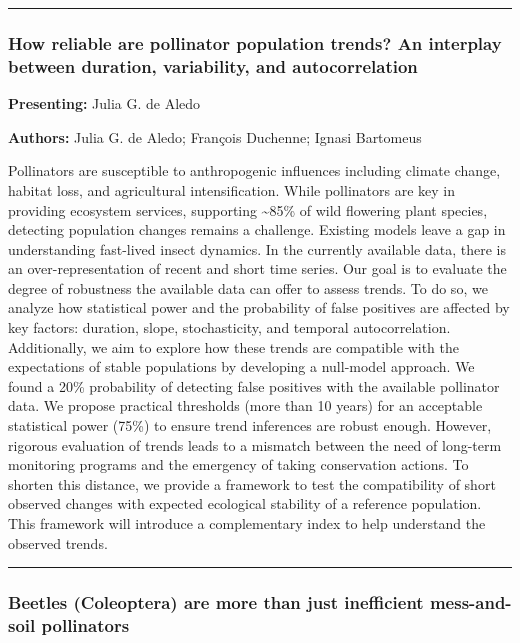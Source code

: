 \documentclass[
  letterpaper,
  DIV=11,
  numbers=noendperiod]{scrartcl}
\begin{document}
\begin{center}\rule{0.5\linewidth}{0.5pt}\end{center}

\subsubsection{How reliable are pollinator population trends? An
interplay between duration, variability, and
autocorrelation}\label{how-reliable-are-pollinator-population-trends-an-interplay-between-duration-variability-and-autocorrelation}

\textbf{Presenting:} Julia G. de Aledo

\textbf{Authors:} Julia G. de Aledo; François Duchenne; Ignasi Bartomeus

Pollinators are susceptible to anthropogenic influences including
climate change, habitat loss, and agricultural intensification. While
pollinators are key in providing ecosystem services, supporting
\textasciitilde85\% of wild flowering plant species, detecting
population changes remains a challenge. Existing models leave a gap in
understanding fast-lived insect dynamics. In the currently available
data, there is an over-representation of recent and short time series.
Our goal is to evaluate the degree of robustness the available data can
offer to assess trends. To do so, we analyze how statistical power and
the probability of false positives are affected by key factors:
duration, slope, stochasticity, and temporal autocorrelation.
Additionally, we aim to explore how these trends are compatible with the
expectations of stable populations by developing a null-model approach.
We found a 20\% probability of detecting false positives with the
available pollinator data. We propose practical thresholds (more than 10
years) for an acceptable statistical power (75\%) to ensure trend
inferences are robust enough. However, rigorous evaluation of trends
leads to a mismatch between the need of long-term monitoring programs
and the emergency of taking conservation actions. To shorten this
distance, we provide a framework to test the compatibility of short
observed changes with expected ecological stability of a reference
population. This framework will introduce a complementary index to help
understand the observed trends.

\begin{center}\rule{0.5\linewidth}{0.5pt}\end{center}

\subsubsection{Beetles (Coleoptera) are more than just inefficient
mess-and-soil
pollinators}\label{beetles-coleoptera-are-more-than-just-inefficient-mess-and-soil-pollinators}
\end{document}
